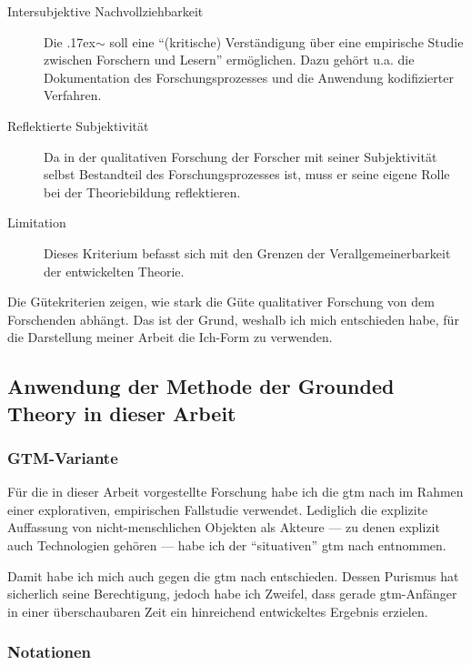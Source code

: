 \begin{description}
  \item[Intersubjektive Nachvollziehbarkeit] Die {\raise.17ex\hbox{$\scriptstyle\sim$}} soll eine ``(kritische) Verständigung über eine empirische Studie zwischen Forschern und Lesern'' ermöglichen. Dazu gehört u.a. die Dokumentation des Forschungsprozesses und die Anwendung kodifizierter Verfahren.
  \item[Reflektierte Subjektivität] Da in der qualitativen Forschung der Forscher mit seiner Subjektivität selbst Bestandteil des Forschungsprozesses ist, muss er seine eigene Rolle bei der Theoriebildung reflektieren.
  \item[Limitation] Dieses Kriterium befasst sich mit den Grenzen der Verallgemeinerbarkeit der entwickelten Theorie.
\end{description} 

\bigskip

Die Gütekriterien zeigen, wie stark die Güte qualitativer Forschung von dem Forschenden abhängt. Das ist der Grund, weshalb ich mich entschieden habe, für die Darstellung meiner Arbeit die Ich-Form zu verwenden.




\subsection{Anwendung der Methode der Grounded Theory in dieser Arbeit}

\subsubsection{GTM-Variante}

Für die in dieser Arbeit vorgestellte Forschung habe ich die \gls{gtm} nach \cite{strauss1990basics} im Rahmen einer explorativen, empirischen Fallstudie verwendet. Lediglich die explizite Auffassung von nicht-menschlichen Objekten als Akteure --- zu denen explizit auch Technologien gehören --- habe ich der ``situativen'' \gls{gtm} nach \cite{clarke2005situational} entnommen.

Damit habe ich mich auch gegen die \gls{gtm} nach \cite{glaser1978theoretical} entschieden. Dessen Purismus hat sicherlich seine Berechtigung, jedoch habe ich Zweifel, dass gerade \gls{gtm}-Anfänger in einer überschaubaren Zeit ein hinreichend entwickeltes Ergebnis erzielen.

\subsubsection{Notationen}
\label{sec:notationen}

